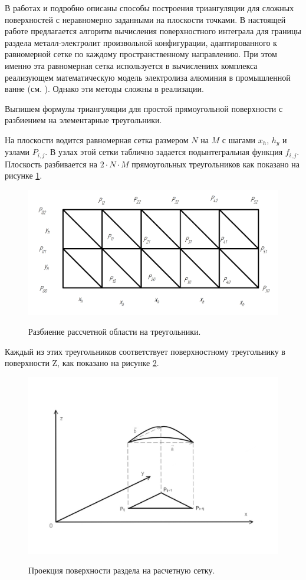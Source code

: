 \documentclass{article}
\begin{document}
В работах \cite{litlink:scvortsov} и \cite{litlink:shirok} подробно описаны способы построения триангуляции для сложных поверхностей с неравномерно заданными на плоскости точками. В настоящей работе предлагается алгоритм вычисления поверхностного интеграла для границы раздела металл-электролит произвольной конфигурации, адаптированного к равномерной сетке по каждому пространственному  направлению. При этом именно эта равномерная сетка используется в вычислениях комплекса реализующем математическую модель электролиза алюминия в промышленной ванне (см. \cite{litlink:kalmykov}). Однако эти методы сложны в реализации.

Выпишем формулы триангуляции для простой прямоугольной поверхности с разбиением на элементарные треугольники.

На плоскости водится равномерная сетка размером $N$ на $M$ с шагами $x_h$, $h_y$ и узлами $P_{i,j}$. В узлах этой сетки таблично задается подынтегральная функция $f_{i,j}$. Плоскость разбивается на $2 \cdot N \cdot M$ прямоугольных треугольников как показано на рисунке \ref{fig:grid}.

\begin{figure}[H]
\centering
\includegraphics[width=0.8\linewidth]{Сетка.png}
\caption{}
\label{fig:grid}
Разбиение рассчетной области на треугольники.
\end{figure}

Каждый из этих треугольников соответствует поверхностному треугольнику в поверхности Z, как показано на рисунке \ref{fig:triangle}.

\begin{figure}[H]
\centering
\includegraphics[width=0.8\linewidth]{Triangle.jpg}
\caption{}
\label{fig:triangle}
Проекция поверхности раздела на расчетную сетку.
\end{figure}
\end{document}
